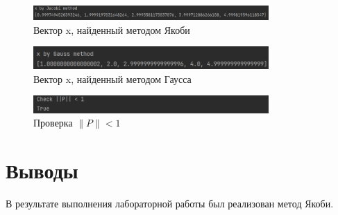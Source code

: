 \documentclass[a4paper, 14pt]{extarticle}
\begin{document}
\begin{figure}[!htb]
	\centering
	\includegraphics[width=0.8\textwidth]{img1}
\caption{Вектор x, найденный методом Якоби}
\label{fig:img1}
\end{figure}

\begin{figure}[!htb]
	\centering
	\includegraphics[width=0.8\textwidth]{img2}
\caption{Вектор x, найденный методом Гаусса}
\label{fig:img2}
\end{figure}

\begin{figure}[!htb]
	\centering
	\includegraphics[width=0.8\textwidth]{img3}
\caption{Проверка $\parallel P \parallel < 1$}
\label{fig:img3}
\end{figure}

\section{Выводы}\label{Sect::conclusion}

В результате выполнения лабораторной работы был реализован метод Якоби.
\end{document}
